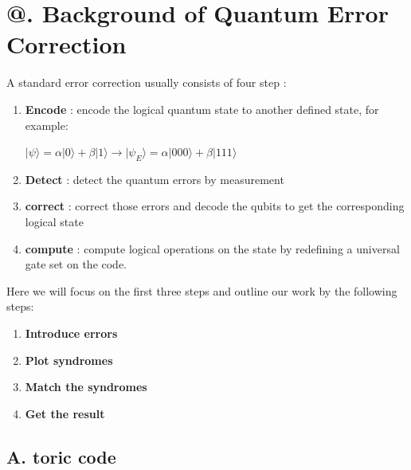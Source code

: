 \documentclass[
    a4paper, %
    10pt, %
    unnumberedsections, %
    twoside, %
]{LTJournalArticle}
\makeatletter
\newcommand{\Rmnum}[1]{\expandafter\@slowromancap\romannumeral #1@}
\makeatother
\begin{document}
\section{\Rmnum{2}. Background of Quantum Error Correction}

A standard error correction usually consists of four step \cite{7}:
\begin{enumerate}
    \item \textbf{Encode} : encode the logical quantum state to another defined state, for example:
    \begin{center}
    $\vert \psi \rangle= \alpha \vert 0 \rangle +\beta \vert 1 \rangle \rightarrow \vert \psi_{E} \rangle=\alpha \vert 000 \rangle +\beta \vert 111 \rangle$
    \end{center} 
    \item \textbf{Detect} : detect the quantum errors by measurement
    \item \textbf{correct} : correct those errors and decode the qubits to get the corresponding logical state
    \item \textbf{compute} : compute logical operations on the state by redefining a universal gate set on the code.
\end{enumerate}
Here we will focus on the first three steps and outline our work by the following steps:
\begin{enumerate}
    \item \textbf{Introduce errors}
    \item \textbf{Plot syndromes}
    \item \textbf{Match the syndromes}
    \item \textbf{Get the result}
\end{enumerate}

\subsection{A. toric code}
\end{document}
